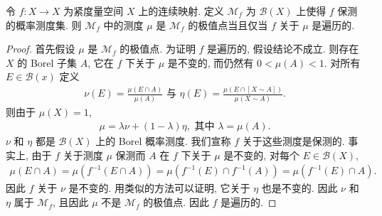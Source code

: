 \documentclass[../../main.tex]{subfiles}
\begin{document}
\begin{proposition}[极值点与遍历性]\label{proposition:ch22-extreme-ergodic}
令 $f:X\to X$ 为紧度量空间 $X$ 上的连续映射. 定义 $\mathcal{M}_{f}$ 为 $\mathcal{B}(X)$ 上使得 $f$ 保测的概率测度集. 则 $\mathcal{M}_{f}$ 中的测度 $\mu$ 是 $\mathcal{M}_{f}$ 的极值点当且仅当 $f$ 关于 $\mu$ 是遍历的.
\end{proposition}

\begin{proof}
首先假设 $\mu$ 是 $\mathcal{M}_{f}$ 的极值点. 为证明 $f$ 是遍历的, 假设结论不成立. 则存在 $X$ 的 Borel 子集 $A$, 它在 $f$ 下关于 $\mu$ 是不变的, 而仍然有 $0<\mu(A)<1$. 对所有 $E\in\mathcal{B}(x)$ 定义
\begin{align*}
\nu(E)=\frac{\mu(E\cap A)}{\mu(A)}\text{ 与 }\eta(E)=\frac{\mu(E\cap[X\sim A])}{\mu(X\sim A)}.
\end{align*}
则由于 $\mu(X)=1$,
\begin{align*}
\mu=\lambda\nu+(1-\lambda)\eta,\text{ 其中 }\lambda=\mu(A).
\end{align*}
$\nu$ 和 $\eta$ 都是 $\mathcal{B}(X)$ 上的 Borel 概率测度. 我们宣称 $f$ 关于这些测度是保测的. 事实上, 由于 $f$ 关于测度 $\mu$ 保测而 $A$ 在 $f$ 下关于 $\mu$ 是不变的, 对每个 $E\in\mathcal{B}(X)$,
\begin{align*}
\mu(E\cap A)=\mu(f^{-1}(E\cap A))=\mu(f^{-1}(E)\cap f^{-1}(A))=\mu(f^{-1}(E)\cap A).
\end{align*}
因此 $f$ 关于 $\nu$ 是不变的. 用类似的方法可以证明, 它关于 $\eta$ 也是不变的. 因此 $\nu$ 和 $\eta$ 属于 $\mathcal{M}_{f}$, 且因此 $\mu$ 不是 $\mathcal{M}_{f}$ 的极值点. 因此 $f$ 是遍历的.


\end{proof}
\end{document}
